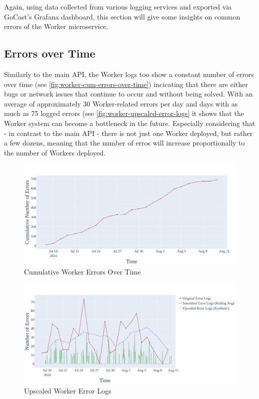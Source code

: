 Again, using data collected from various logging services and exported via GoCast's Grafana dashboard, this section will give some insights on common errors of the Worker microservice.

\subsection{Errors over Time}

Similarly to the main \ac{API}, the Worker logs too show a constant number of errors over time (see \autoref{fig:worker-cum-errors-over-time}) incicating that there are either bugs or network issues that continue to occur and without being solved. With an average of approximately 30 Worker-related errors per day and days with as much as 75 logged errors (see \autoref{fig:worker-upscaled-error-logs} it shows that the Worker system can become a bottleneck in the future. Especially considering that - in contrast to the main \ac{API} - there is not just one Worker deployed, but rather a few dozens, meaning that the number of erros will increase proportionally to the number of Workers deployed. 

\begin{figure}[htpb]
    \centering
    \includegraphics[width=\linewidth]{images/plots/worker/cum_errors_over_time.png}
    \caption[Cumulative Worker Errors Over Time]{Cumulative Worker Errors Over Time}\label{fig:worker-cum-errors-over-time}
\end{figure}

\begin{figure}[htpb]
    \centering
    \includegraphics[width=\linewidth]{images/plots/worker/upscaled_error_logs.png}
    \caption[Upscaled Worker Error Logs]{Upscaled Worker Error Logs}\label{fig:worker-upscaled-error-logs}
\end{figure}

